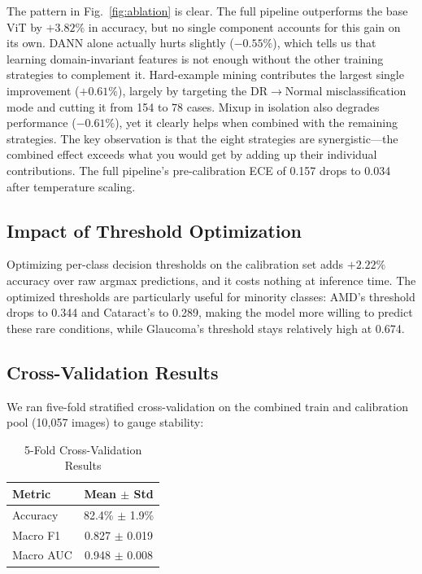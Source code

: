 \documentclass[conference]{IEEEtran}
\begin{document}
The pattern in Fig.~\ref{fig:ablation} is clear. The full pipeline outperforms the base ViT by $+3.82\%$ in accuracy, but no single component accounts for this gain on its own. DANN alone actually hurts slightly ($-0.55\%$), which tells us that learning domain-invariant features is not enough without the other training strategies to complement it. Hard-example mining contributes the largest single improvement ($+0.61\%$), largely by targeting the DR$\rightarrow$Normal misclassification mode and cutting it from 154 to 78 cases. Mixup in isolation also degrades performance ($-0.61\%$), yet it clearly helps when combined with the remaining strategies. The key observation is that the eight strategies are synergistic---the combined effect exceeds what you would get by adding up their individual contributions. The full pipeline's pre-calibration ECE of 0.157 drops to 0.034 after temperature scaling.

\subsection{Impact of Threshold Optimization}

Optimizing per-class decision thresholds on the calibration set adds $+2.22\%$ accuracy over raw argmax predictions, and it costs nothing at inference time. The optimized thresholds are particularly useful for minority classes: AMD's threshold drops to 0.344 and Cataract's to 0.289, making the model more willing to predict these rare conditions, while Glaucoma's threshold stays relatively high at 0.674.

\subsection{Cross-Validation Results}

We ran five-fold stratified cross-validation on the combined train and calibration pool (10,057 images) to gauge stability:

\begin{table}[h]
\centering
\caption{5-Fold Cross-Validation Results}
\label{tab:kfold}
\begin{tabular}{lc}
\toprule
\textbf{Metric} & \textbf{Mean $\pm$ Std} \\
\midrule
Accuracy & 82.4\% $\pm$ 1.9\% \\
Macro F1 & 0.827 $\pm$ 0.019 \\
Macro AUC & 0.948 $\pm$ 0.008 \\
\bottomrule
\end{tabular}
\end{table}
\end{document}
